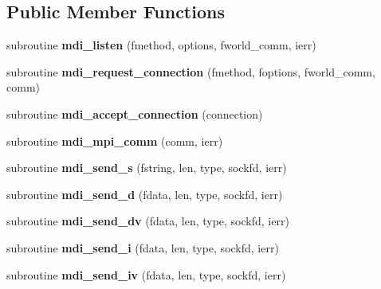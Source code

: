 \subsection*{Public Member Functions}
\begin{DoxyCompactItemize}
\item 
\hypertarget{classmdi_abb29b2ed5c592d2c5e4585ca14ae9c69}{subroutine {\bfseries mdi\-\_\-listen} (fmethod, options, fworld\-\_\-comm, ierr)}\label{classmdi_abb29b2ed5c592d2c5e4585ca14ae9c69}

\item 
\hypertarget{classmdi_ae6b39060c3cc856f240b5239a87a63d8}{subroutine {\bfseries mdi\-\_\-request\-\_\-connection} (fmethod, foptions, fworld\-\_\-comm, comm)}\label{classmdi_ae6b39060c3cc856f240b5239a87a63d8}

\item 
\hypertarget{classmdi_a5f9df9a8c58f50163196ee7ce57d63d6}{subroutine {\bfseries mdi\-\_\-accept\-\_\-connection} (connection)}\label{classmdi_a5f9df9a8c58f50163196ee7ce57d63d6}

\item 
\hypertarget{classmdi_a127a7303cd7217c0d0d646e10b188f39}{subroutine {\bfseries mdi\-\_\-mpi\-\_\-comm} (comm, ierr)}\label{classmdi_a127a7303cd7217c0d0d646e10b188f39}

\item 
\hypertarget{classmdi_a83a8409162740c37f82776526e19d4cf}{subroutine {\bfseries mdi\-\_\-send\-\_\-s} (fstring, len, type, sockfd, ierr)}\label{classmdi_a83a8409162740c37f82776526e19d4cf}

\item 
\hypertarget{classmdi_ad5a7755632e8712b6d5609e2486b184a}{subroutine {\bfseries mdi\-\_\-send\-\_\-d} (fdata, len, type, sockfd, ierr)}\label{classmdi_ad5a7755632e8712b6d5609e2486b184a}

\item 
\hypertarget{classmdi_a57bcbe45a8445f19b02126f904b43774}{subroutine {\bfseries mdi\-\_\-send\-\_\-dv} (fdata, len, type, sockfd, ierr)}\label{classmdi_a57bcbe45a8445f19b02126f904b43774}

\item 
\hypertarget{classmdi_a9451f9ead8226273424cb7efbef245c3}{subroutine {\bfseries mdi\-\_\-send\-\_\-i} (fdata, len, type, sockfd, ierr)}\label{classmdi_a9451f9ead8226273424cb7efbef245c3}

\item 
\hypertarget{classmdi_add16db0836d8e0f3cfe310e175e8243c}{subroutine {\bfseries mdi\-\_\-send\-\_\-iv} (fdata, len, type, sockfd, ierr)}\label{classmdi_add16db0836d8e0f3cfe310e175e8243c}


\end{DoxyCompactItemize}
